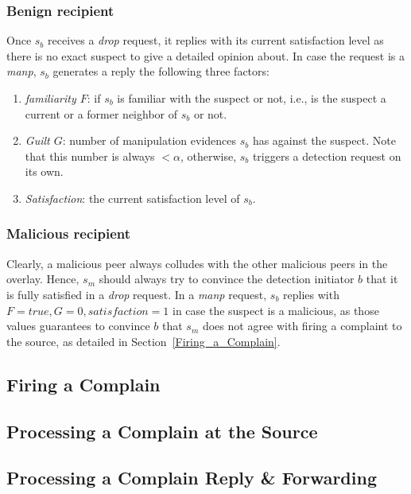 \subsubsection*{Benign recipient}
Once $s_b$ receives a \textit{drop} request, it replies with its current satisfaction level as there is no exact suspect to give a detailed opinion about.
In case the request is a \textit{manp}, $s_b$ generates a reply the following three factors:
\begin{enumerate}
 \item \textit{familiarity $F$}: if $s_b$ is familiar with the suspect or not, i.e., is the suspect a current or a former neighbor of $s_b$ or not.
 \item \textit{Guilt $G$}: number of manipulation evidences $s_b$ has against the suspect. Note that this number is always $<\alpha$, otherwise, $s_b$ triggers a detection request on its own.
 \item \textit{Satisfaction}: the current satisfaction level of $s_b$.
\end{enumerate}


\subsubsection*{Malicious recipient}
Clearly, a malicious peer always colludes with the other malicious peers in the overlay. Hence, $s_m$ should always try to convince the detection initiator $b$ that it is fully satisfied in a \textit{drop} request.
In a \textit{manp} request, $s_b$ replies with $F=true, G=0, satisfaction=1$ in case the suspect is a malicious, as those values guarantees to convince $b$ that $s_m$ does not agree with firing a complaint to the source, as detailed in Section~\ref{Firing_a_Complain}.

\subsection{Firing a Complain}
\label{sec:Firing_a_Complain}

\subsection{Processing a Complain at the Source}
\label{sec:complaint_source}

\subsection{Processing a Complain Reply \& Forwarding}







